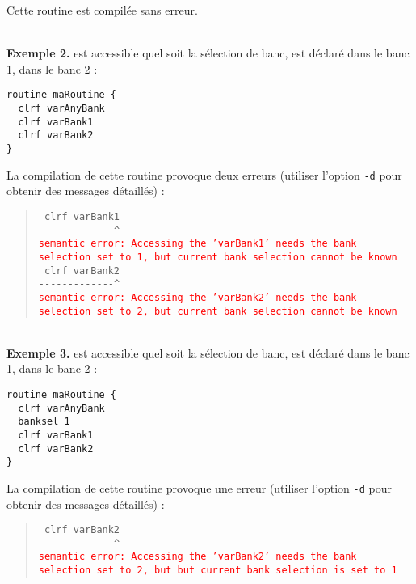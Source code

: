 Cette routine est compilée sans erreur.


~\\
\textbf{Exemple 2.}  est accessible quel soit la sélection de banc,  est déclaré dans le banc 1,  dans le banc 2 :
\begin{lstlisting}[language=piccolo]
routine maRoutine {
  clrf varAnyBank
  clrf varBank1
  clrf varBank2
}
\end{lstlisting}

La compilation de cette routine provoque deux erreurs (utiliser l’option \texttt{-d} pour obtenir des messages détaillés) :

\begin{quote}
\texttt{  clrf varBank1}\\
\texttt{-{-}-{-}-{-}-{-}-{-}-{-}-\^{}}\\
\textcolor{red}{\tt semantic error: Accessing the 'varBank1' needs the bank selection set to 1, but current bank selection cannot be known}\\

\texttt{  clrf varBank2}\\
\texttt{-{-}-{-}-{-}-{-}-{-}-{-}-\^}\\
\textcolor{red}{\tt semantic error: Accessing the 'varBank2' needs the bank selection set to 2, but current bank selection cannot be known}
\end{quote}




~\\
\textbf{Exemple 3.}  est accessible quel soit la sélection de banc,  est déclaré dans le banc 1,  dans le banc 2 :
\begin{lstlisting}[language=piccolo]
routine maRoutine {
  clrf varAnyBank
  banksel 1
  clrf varBank1
  clrf varBank2
}
\end{lstlisting}

La compilation de cette routine provoque une erreur (utiliser l’option \texttt{-d} pour obtenir des messages détaillés) :

\begin{quote}
\texttt{  clrf varBank2}\\
\texttt{-{-}-{-}-{-}-{-}-{-}-{-}-\^}\\
\textcolor{red}{\tt semantic error: Accessing the 'varBank2' needs the bank selection set to 2, but but current bank selection is set to 1}
\end{quote}













